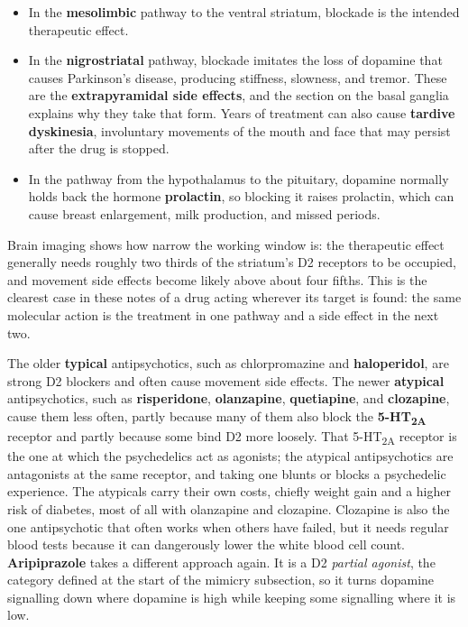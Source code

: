 \documentclass[11pt]{article}
\begin{document}
\begin{itemize}
    \item In the \textbf{mesolimbic} pathway to the ventral striatum, blockade is the intended therapeutic effect.
    \item In the \textbf{nigrostriatal} pathway, blockade imitates the loss of dopamine that causes Parkinson's disease, producing stiffness, slowness, and tremor. These are the \textbf{extrapyramidal side effects}, and the section on the basal ganglia explains why they take that form. Years of treatment can also cause \textbf{tardive dyskinesia}, involuntary movements of the mouth and face that may persist after the drug is stopped.
    \item In the pathway from the hypothalamus to the pituitary, dopamine normally holds back the hormone \textbf{prolactin}, so blocking it raises prolactin, which can cause breast enlargement, milk production, and missed periods.
\end{itemize}

Brain imaging shows how narrow the working window is: the therapeutic effect generally needs roughly two thirds of the striatum's D2 receptors to be occupied, and movement side effects become likely above about four fifths. This is the clearest case in these notes of a drug acting wherever its target is found: the same molecular action is the treatment in one pathway and a side effect in the next two.

The older \textbf{typical} antipsychotics, such as chlorpromazine and \textbf{haloperidol}, are strong D2 blockers and often cause movement side effects. The newer \textbf{atypical} antipsychotics, such as \textbf{risperidone}, \textbf{olanzapine}, \textbf{quetiapine}, and \textbf{clozapine}, cause them less often, partly because many of them also block the \textbf{5-HT\textsubscript{2A}} receptor and partly because some bind D2 more loosely. That 5-HT\textsubscript{2A} receptor is the one at which the psychedelics act as agonists; the atypical antipsychotics are antagonists at the same receptor, and taking one blunts or blocks a psychedelic experience. The atypicals carry their own costs, chiefly weight gain and a higher risk of diabetes, most of all with olanzapine and clozapine. Clozapine is also the one antipsychotic that often works when others have failed, but it needs regular blood tests because it can dangerously lower the white blood cell count. \textbf{Aripiprazole} takes a different approach again. It is a D2 \textit{partial agonist}, the category defined at the start of the mimicry subsection, so it turns dopamine signalling down where dopamine is high while keeping some signalling where it is low.
\end{document}
